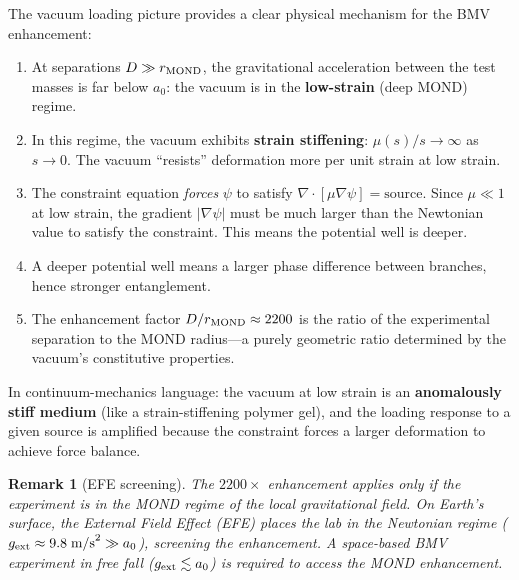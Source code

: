 \documentclass[11pt,a4paper]{article}
\newtheorem*{remark}{Remark}
\begin{document}
\begin{tcolorbox}[colback=red!5, colframe=red!50!black,
title=Loading Interpretation of BMV Enhancement]
The vacuum loading picture provides a clear physical mechanism for the BMV
enhancement:

\begin{enumerate}
\item At separations $D \gg r_{\rm MOND}$, the gravitational acceleration
between the test masses is far below $a_0$: the vacuum is in the
\textbf{low-strain} (deep MOND) regime.

\item In this regime, the vacuum exhibits \textbf{strain stiffening}:
$\mu(s)/s \to \infty$ as $s \to 0$.  The vacuum ``resists''
deformation more per unit strain at low strain.

\item The constraint equation \emph{forces} $\psi$ to satisfy
$\nabla\cdot[\mu\nabla\psi] = \text{source}$.  Since $\mu \ll 1$
at low strain, the gradient $|\nabla\psi|$ must be much larger than
the Newtonian value to satisfy the constraint.  This means the
potential well is deeper.

\item A deeper potential well means a larger phase difference between
branches, hence stronger entanglement.

\item The enhancement factor $D/r_{\rm MOND} \approx 2200$ is the ratio
of the experimental separation to the MOND radius---a purely
geometric ratio determined by the vacuum's constitutive properties.
\end{enumerate}

In continuum-mechanics language: the vacuum at low strain is an
\textbf{anomalously stiff medium} (like a strain-stiffening polymer gel),
and the loading response to a given source is amplified because the
constraint forces a larger deformation to achieve force balance.
\end{tcolorbox}

\begin{remark}[EFE screening]
The $2200\times$ enhancement applies only if the experiment is in the MOND
regime of the \emph{local} gravitational field.  On Earth's surface, the
External Field Effect (EFE) places the lab in the Newtonian regime
($g_{\rm ext} \approx 9.8\;\text{m/s}^2 \gg a_0$), screening the
enhancement.  A space-based BMV experiment in free fall ($g_{\rm ext}
\lesssim a_0$) is required to access the MOND enhancement.
\end{remark}
\end{document}
